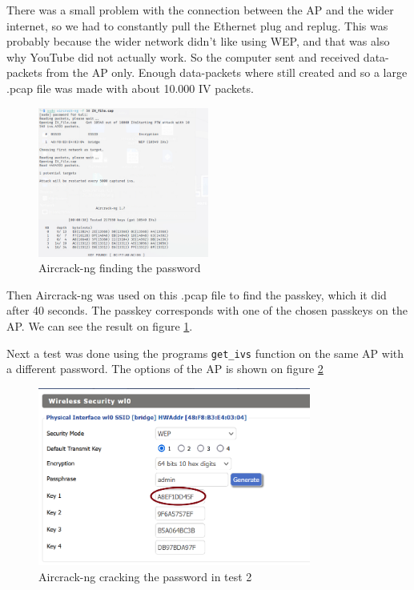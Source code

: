 There was a small problem with the connection between the AP and the wider internet, so we had to constantly pull the Ethernet plug and replug. This was probably because the wider network didn't like using WEP, and that was also why YouTube did not actually work. So the computer sent and received data-packets from the AP only. Enough data-packets where still created and so a large .pcap file was made with about 10.000 IV packets. 

\begin{figure}[!htbp]
    \centering
    \includegraphics[width=0.5\textwidth]{Latex-Files/Billeder/Kode1.png}
    \caption{Aircrack-ng finding the password}
    \label{Crack1}
\end{figure}


Then Aircrack-ng was used on this .pcap file to find the passkey, which it did after 40 seconds. The passkey corresponds with one of the chosen passkeys on the AP. We can see the result on figure \ref{Crack1}.

Next a test was done using the programs \lstinline{get_ivs} function on the same AP with a different password. The options of the AP is shown on figure \ref{Crack3} 
\begin{figure}[!htbp]
    \centering
    \includegraphics[width=0.8\textwidth]{Latex-Files/Billeder/Tests/WEP1.png}
    \caption{Aircrack-ng cracking the password in test 2}
    \label{Crack3}
\end{figure}

